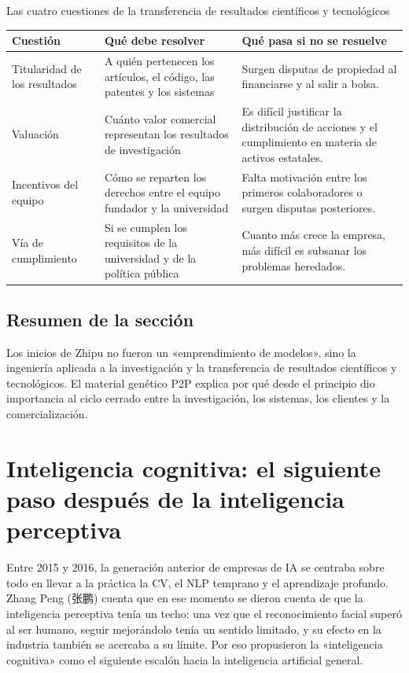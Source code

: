 \documentclass[a4paper]{article}
\begin{document}
\begin{knowledgebox}{Las cuatro cuestiones de la transferencia de resultados científicos y tecnológicos}
\begin{tabularx}{\textwidth}{p{}p{}X}
\toprule
Cuestión & Qué debe resolver & Qué pasa si no se resuelve \\
\midrule
Titularidad de los resultados & A quién pertenecen los artículos, el código, las patentes y los sistemas & Surgen disputas de propiedad al financiarse y al salir a bolsa. \\
Valuación & Cuánto valor comercial representan los resultados de investigación & Es difícil justificar la distribución de acciones y el cumplimiento en materia de activos estatales. \\
Incentivos del equipo & Cómo se reparten los derechos entre el equipo fundador y la universidad & Falta motivación entre los primeros colaboradores o surgen disputas posteriores. \\
Vía de cumplimiento & Si se cumplen los requisitos de la universidad y de la política pública & Cuanto más crece la empresa, más difícil es subsanar los problemas heredados. \\
\bottomrule
\end{tabularx}
\end{knowledgebox}

\subsection{Resumen de la sección}

Los inicios de Zhipu no fueron un «emprendimiento de modelos», sino la ingeniería aplicada a la investigación y la transferencia de resultados científicos y tecnológicos. El material genético P2P explica por qué desde el principio dio importancia al ciclo cerrado entre la investigación, los sistemas, los clientes y la comercialización.
\section{Inteligencia cognitiva: el siguiente paso después de la inteligencia perceptiva}

Entre 2015 y 2016, la generación anterior de empresas de IA se centraba sobre todo en llevar a la práctica la CV, el NLP temprano y el aprendizaje profundo. Zhang Peng (张鹏) cuenta que en ese momento se dieron cuenta de que la inteligencia perceptiva tenía un techo: una vez que el reconocimiento facial superó al ser humano, seguir mejorándolo tenía un sentido limitado, y su efecto en la industria también se acercaba a su límite. Por eso propusieron la «inteligencia cognitiva» como el siguiente escalón hacia la inteligencia artificial general.
\end{document}
